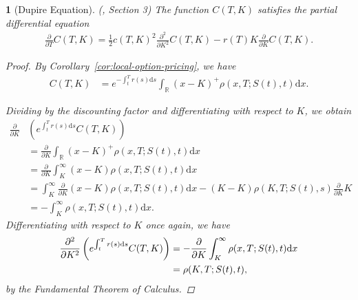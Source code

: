 \documentclass[english]{article}
\numberwithin{equation}{section}
\numberwithin{figure}{section}
\theoremstyle{bolddescit}
\newtheorem{theorem}{\protect\theoremname}[section]
\theoremstyle{definition}
\theoremstyle{definition}
\theoremstyle{plain}
\theoremstyle{plain}
\theoremstyle{bolddesc}
\theoremstyle{plain}
\theoremstyle{remark}
\providecommand{\theoremname}{Theorem}
\begin{document}
\begin{theorem}[Dupire Equation]\label{thm:dupire}
  (\cite{dupire_pricing_1993}, Section 3)
  The function $C(T,K)$ satisfies the partial differential equation
  \begin{align*}
    \frac{\partial}{\partial T}C(T,K) = \frac{1}{2} c(T,K)^2 \frac{\partial^2}{\partial K^2} C(T,K) - r(T) K \frac{\partial}{\partial K}C(T,K).
  \end{align*}

  \begin{proof}
    By Corollary~\ref{cor:local-option-pricing}, we have
    \begin{align*}
      C(T,K) &= e^{-\int_t^T r(s) \mathrm{d}s} \int_{\mathbb{R}} \left(x - K\right)^+ \rho(x,T;S(t),t) \mathrm{d}x.
    \end{align*}

    Dividing by the discounting factor and differentiating with respect to $K$, we obtain
    \begin{align*}
      \frac{\partial}{\partial K}&\left(e^{\int_t^T r(s) \mathrm{d}s} C(T,K)\right)\\
      &= \frac{\partial}{\partial K} \int_{\mathbb{R}} \left(x - K\right)^+ \rho(x,T;S(t),t) \mathrm{d}x\\
      &= \frac{\partial}{\partial K} \int_K^\infty \left(x - K\right) \rho(x,T;S(t),t) \mathrm{d}x\\
      &= \int_K^\infty \frac{\partial}{\partial K} \left(x - K\right) \rho(x,T;S(t),t) \mathrm{d}x - (K-K) \rho(K,T;S(t),s) \frac{\partial}{\partial K} K \tag{Leibniz Integral Rule}\\
      &= - \int_K^\infty \rho(x,T;S(t),t) \mathrm{d}x.
    \end{align*}
    Differentiating with respect to $K$ once again, we have
    \begin{align}
      \frac{\partial^2}{\partial K^2}\left(e^{\int_t^T r(s) \mathrm{d}s} C(T,K)\right)
      &= - \frac{\partial}{\partial K}\int_K^\infty \rho(x,T;S(t),t) \mathrm{d}x\notag\\
      &= \rho(K,T;S(t),t),\label{eq:dupire-rho}
    \end{align}
    by the Fundamental Theorem of Calculus.


\end{proof}
\end{theorem}
\end{document}
